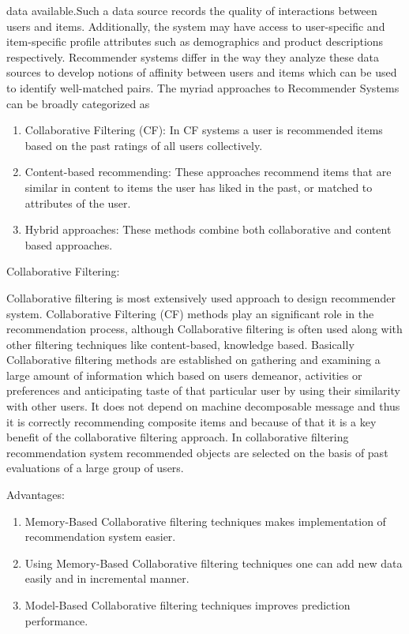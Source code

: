 \documentclass{tcc}
\begin{document}
data available.Such a data source records the quality of interactions between users and items. Additionally, the system may have access to user-specific and item-specific profile attributes such as demographics and product descriptions respectively. Recommender systems differ in the way they analyze these data sources to develop notions of affinity between users and items which can be used to identify well-matched pairs.
The myriad approaches to Recommender Systems can be broadly categorized as
\begin{enumerate}
    \item Collaborative Filtering (CF): In CF systems a user is recommended items based on the past ratings of all users collectively.
    \item Content-based recommending: These approaches recommend items that are similar in content to items the user has liked in the past, or matched to attributes of the user.
    \item Hybrid approaches: These methods combine both collaborative and content based approaches.
\end{enumerate}
\newpage
\begin{flushleft}
\Large{{\selectfont
Collaborative Filtering:
}}
\end{flushleft}
Collaborative filtering is most extensively used approach to design recommender system. Collaborative Filtering (CF) methods play an significant role in the recommendation process, although Collaborative filtering is often used along with other filtering techniques like content-based, knowledge based. Basically Collaborative filtering methods are established on gathering and examining a large amount of information which based on users demeanor, activities or preferences and anticipating taste of that particular user by
using their similarity with other users. It does not depend on machine decomposable message and thus it is correctly recommending composite items and because of that it is a key benefit of the collaborative filtering approach. In collaborative filtering recommendation system recommended objects are selected on the basis of past evaluations of a large group of users.
\begin{flushleft}
Advantages:
\end{flushleft}
\begin{enumerate}
    \item Memory-Based Collaborative filtering techniques makes implementation of recommendation system easier.
    \item Using Memory-Based Collaborative filtering techniques one can add new data easily and in incremental manner.
    \item Model-Based Collaborative filtering techniques improves prediction performance.
\end{enumerate}
\end{document}
